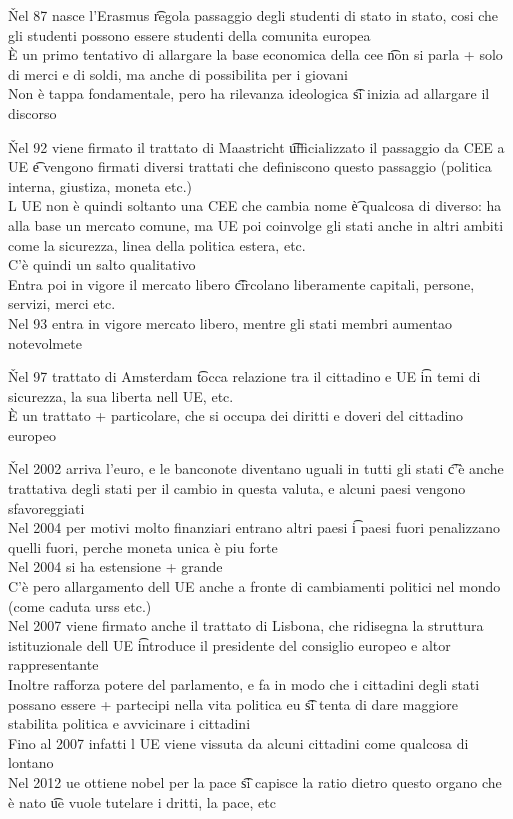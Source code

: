 \documentclass[12pt]{article}
\begin{document}
\v

Nel 87 nasce l'Erasmus \t regola passaggio degli studenti di stato in stato, cosi che gli studenti possono essere studenti della comunita europea \\
È un primo tentativo di allargare la base economica della cee \t non si parla + solo di merci e di soldi, ma anche di possibilita per i giovani \\
Non è tappa fondamentale, pero ha rilevanza ideologica \t si inizia ad allargare il discorso

\v

Nel 92 viene firmato il trattato di Maastricht \t ufficializzato il passaggio da CEE a UE \t e vengono firmati diversi trattati che definiscono questo passaggio (politica interna, giustiza, moneta etc.) \\
L UE non è quindi soltanto una CEE che cambia nome \t è qualcosa di diverso: ha alla base un mercato comune, ma UE poi coinvolge gli stati anche in altri ambiti come la sicurezza, linea della politica estera, etc. \\
C'è quindi un salto qualitativo \\
Entra poi in vigore il mercato libero \t circolano liberamente capitali, persone, servizi, merci etc. \\
Nel 93 entra in vigore mercato libero, mentre gli stati membri aumentao notevolmete

\v

Nel 97 trattato di Amsterdam \t tocca relazione tra il cittadino e UE \t in temi di sicurezza, la sua liberta nell UE, etc. \\
È un trattato + particolare, che si occupa dei diritti e doveri del cittadino europeo

\v

Nel 2002 arriva l'euro, e le banconote diventano uguali in tutti gli stati \t c'è anche trattativa degli stati per il cambio in questa valuta, e alcuni paesi vengono sfavoreggiati \\
Nel 2004 per motivi molto finanziari entrano altri paesi \t i paesi fuori penalizzano quelli fuori, perche moneta unica è piu forte \\
Nel 2004 si ha estensione + grande \\
C'è pero allargamento dell UE anche a fronte di cambiamenti politici nel mondo (come caduta urss etc.) \\
Nel 2007 viene firmato anche il trattato di Lisbona, che ridisegna la struttura istituzionale dell UE \t introduce il presidente del consiglio europeo e altor rappresentante \\
Inoltre rafforza potere del parlamento, e fa in modo che i cittadini degli stati possano essere + partecipi nella vita politica eu \t si tenta di dare maggiore stabilita politica e avvicinare i cittadini \\
Fino al 2007 infatti l UE viene vissuta da alcuni cittadini come qualcosa di lontano \\
Nel 2012 ue ottiene nobel per la pace \t si capisce la ratio dietro questo organo che è nato \t ue vuole tutelare i dritti, la pace, etc
\end{document}
